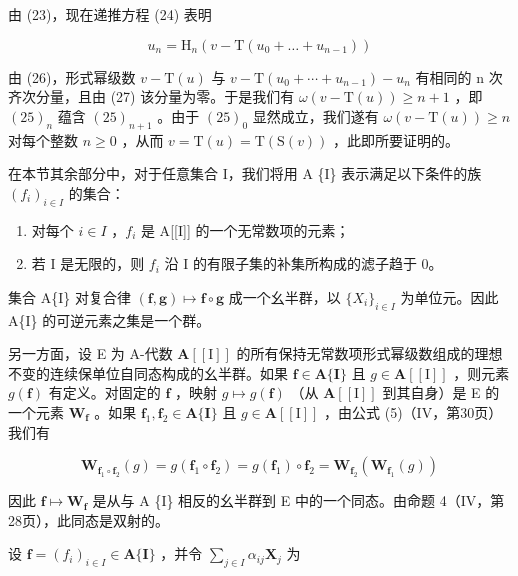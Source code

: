 由 (23)，现在递推方程 (24) 表明

\[
u _ {n} = \mathrm{H} _ {n} (v - \mathrm{T} (u _ {0} + \dots + u _ {n - 1}))\tag{27}
\]

由 (26)，形式幂级数 \(v - \mathrm{T}(u)\) 与 \(v - \mathrm{T}(u_{0} + \cdots + u_{n-1}) - u_{n}\) 有相同的 n 次齐次分量，且由 (27) 该分量为零。于是我们有 \(\omega(v - \mathrm{T}(u)) \geqslant n + 1\) ，即 \((25)_{n}\) 蕴含 \((25)_{n+1}\) 。由于 \((25)_{0}\) 显然成立，我们遂有 \(\omega(v - \mathrm{T}(u)) \geqslant n\) 对每个整数 \(n \geqslant 0\) ，从而 \(v = \mathrm{T}(u) = \mathrm{T}(\mathrm{S}(v))\) ，此即所要证明的。

在本节其余部分中，对于任意集合 I，我们将用 A \{I\} 表示满足以下条件的族 \((f_i)_{i\in I}\) 的集合：

\begin{enumerate}
\def\labelenumi{(\roman{enumi})}
\item
  对每个 \(i \in I\) ，\(f_i\) 是 A{[}{[}I{]}{]} 的一个无常数项的元素；
\item
  若 I 是无限的，则 \(f_{i}\) 沿 I 的有限子集的补集所构成的滤子趋于 0。
\end{enumerate}

集合 A\{I\} 对复合律 \((\mathbf{f},\mathbf{g})\mapsto\mathbf{f}\circ\mathbf{g}\) 成一个幺半群，以 \(\{X_{i}\}_{i\in I}\) 为单位元。因此 A\{I\} 的可逆元素之集是一个群。

另一方面，设 E 为 A-代数 \(\mathbf{A}[[\mathrm{I}]]\) 的所有保持无常数项形式幂级数组成的理想不变的连续保单位自同态构成的幺半群。如果 \(\mathbf{f} \in \mathbf{A}\{\mathbf{I}\}\) 且 \(g \in \mathbf{A}[[\mathrm{I}]]\) ，则元素 \(g(\mathbf{f})\) 有定义。对固定的 \(\mathbf{f}\) ，映射 \(g \mapsto g(\mathbf{f})\) （从 \(\mathbf{A}[[\mathrm{I}]]\) 到其自身）是 E 的一个元素 \(\mathbf{W}_{\mathbf{f}}\) 。如果 \(\mathbf{f}_1, \mathbf{f}_2 \in \mathbf{A}\{\mathbf{I}\}\) 且 \(g \in \mathbf{A}[[\mathrm{I}]]\) ，由公式 (5)（IV，第30页）我们有

\[
\mathbf {W} _ {\mathbf {f} _ {1} \circ \mathbf {f} _ {2}} (g) = g (\mathbf {f} _ {1} \circ \mathbf {f} _ {2}) = g (\mathbf {f} _ {1}) \circ \mathbf {f} _ {2} = \mathbf {W} _ {\mathbf {f} _ {2}} (\mathbf {W} _ {\mathbf {f} _ {1}} (g))
\]

因此 \(\mathbf{f} \mapsto \mathbf{W}_{\mathbf{f}}\) 是从与 A \{I\} 相反的幺半群到 E 中的一个同态。由命题 4（IV，第28页），此同态是双射的。

设 \(\mathbf{f} = (f_i)_{i\in I}\in \mathbf{A}\{\mathbf{I}\}\) ，并令 \(\sum_{j\in I}\alpha_{ij}\mathbf{X}_j\) 为

